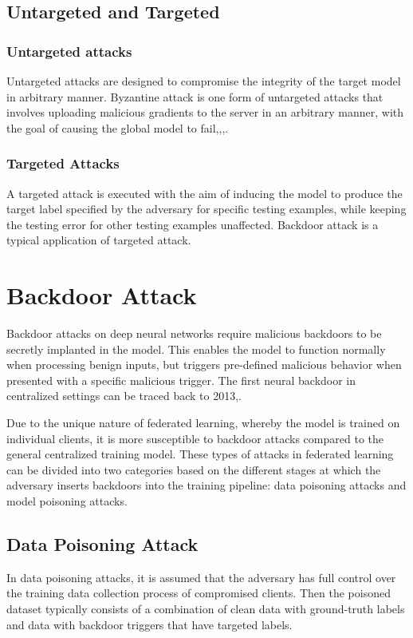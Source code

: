 \documentclass[conference]{IEEEtran}
\begin{document}
\subsection{Untargeted and Targeted}
\subsubsection{Untargeted attacks}Untargeted attacks are designed to compromise
the integrity of the target model in  arbitrary manner.
Byzantine attack is one form of untargeted attacks that involves
uploading malicious gradients to the server in an arbitrary manner,
with the goal of causing the global model to fail\cite{b48},\cite{b49},\cite{b50},\cite{b51}.
\subsubsection{Targeted Attacks}A targeted attack is executed with
the aim of inducing the model to produce the target label specified by the
adversary for specific testing examples, while keeping the testing error for
other testing examples unaffected\cite{b51}. Backdoor attack is a typical application of targeted attack.


\section{Backdoor Attack}
Backdoor attacks on deep neural networks require malicious backdoors to be secretly implanted in the model. 
This enables the model to function
normally when processing benign inputs, but triggers  pre-defined
malicious behavior when presented with a specific malicious trigger.
The first neural backdoor in centralized settings can be traced
back to 2013\cite{b52},\cite{b53}.

Due to the unique nature of federated learning, whereby the model is trained
on individual clients, it is more susceptible to backdoor attacks compared
to the general centralized training model. These types of attacks in federated
learning can be divided into two categories based on the different stages at
which the adversary inserts backdoors into the training pipeline: data
poisoning attacks and model poisoning attacks.

\subsection{Data Poisoning Attack}
In data poisoning attacks, it is assumed that the adversary has full control
over the training data collection process of compromised clients. Then the poisoned
dataset typically consists of a combination of clean data with ground-truth labels
and data with backdoor triggers that have targeted labels.
\end{document}
